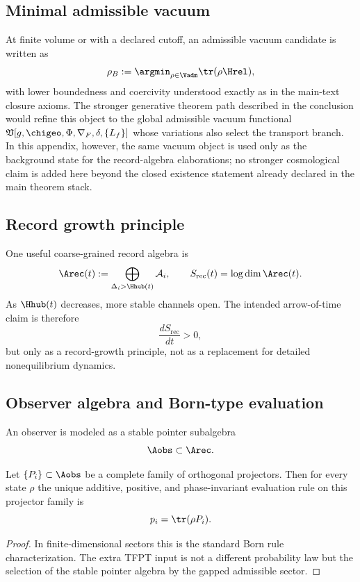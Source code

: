 \subsection{Minimal admissible vacuum}

At finite volume or with a declared cutoff, an admissible vacuum candidate is written as
\[
\rho_B
:=
\argmin_{\rho\in\Vadm}\tr(\rho\Hrel),
\]
with lower boundedness and coercivity understood exactly as in the main-text closure axioms. The stronger generative theorem path described in the conclusion would refine this object to the global admissible vacuum functional $\mathfrak V[g,\chigeo,\Phi,\nabla_F,\delta,\{L_f\}]$ whose variations also select the transport branch. In this appendix, however, the same vacuum object is used only as the background state for the record-algebra elaborations; no stronger cosmological claim is added here beyond the closed existence statement already declared in the main theorem stack.

\subsection{Record growth principle}

One useful coarse-grained record algebra is
\[
\Arec(t):=\bigoplus_{\Delta_i>\Hhub(t)}\mathcal A_i,
\qquad
S_{\mathrm{rec}}(t)=\log\dim\Arec(t).
\]
As $\Hhub(t)$ decreases, more stable channels open. The intended arrow-of-time claim is therefore
\[
\frac{dS_{\mathrm{rec}}}{dt}>0,
\]
but only as a record-growth principle, not as a replacement for detailed nonequilibrium dynamics.

\subsection{Observer algebra and Born-type evaluation}

An observer is modeled as a stable pointer subalgebra
\[
\Aobs\subset\Arec.
\]

\begin{theorem}
\label{thm:born-pointer-algebra}
Let $\{P_i\}\subset \Aobs$ be a complete family of orthogonal projectors. Then for every state
$\rho$ the unique additive, positive, and phase-invariant evaluation rule on this projector family is
\[
p_i=\tr(\rho P_i).
\]
\end{theorem}

\begin{proof}
In finite-dimensional sectors this is the standard Born rule characterization. The extra TFPT input
is not a different probability law but the selection of the stable pointer algebra by the gapped
admissible sector.
\end{proof}

